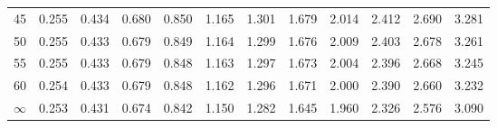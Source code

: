 \documentclass[a4paper, 10pt]{article}
\begin{document}
\begin{center}
\begin{supertabular}{rrrrrrrrrrrr}
        45       & 0.255 & 0.434 & 0.680 & 0.850 & 1.165 & 1.301 & 1.679 & 2.014  & 2.412  & 2.690  & 3.281 \\
        50       & 0.255 & 0.433 & 0.679 & 0.849 & 1.164 & 1.299 & 1.676 & 2.009  & 2.403  & 2.678  & 3.261 \\
        55       & 0.255 & 0.433 & 0.679 & 0.848 & 1.163 & 1.297 & 1.673 & 2.004  & 2.396  & 2.668  & 3.245 \\
        60       & 0.254 & 0.433 & 0.679 & 0.848 & 1.162 & 1.296 & 1.671 & 2.000  & 2.390  & 2.660  & 3.232 \\
        $\infty$ & 0.253 & 0.431 & 0.674 & 0.842 & 1.150 & 1.282 & 1.645 & 1.960  & 2.326  & 2.576  & 3.090 \\
        \bottomrule
    \end{supertabular}
\end{center}
\end{document}
